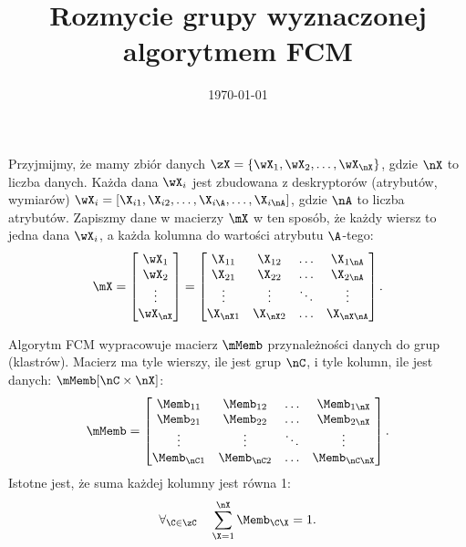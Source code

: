 \documentclass[a4paper,12pt]{article}
\title{\sffamily\bfseries Rozmycie grupy wyznaczonej algorytmem FCM}
\author{}
\date{\today}
\begin{document}
\maketitle

Przyjmijmy, że mamy zbiór danych $\zX = \left\{\wX_1, \wX_2, \ldots, \wX_\nX\right\}$, gdzie $\nX$ to liczba danych.
Każda dana $\wX_i$ jest zbudowana z deskryptorów (atrybutów, wymiarów) $\wX_i = \left[ \X_{i1}, \X_{i2}, \ldots, \X_{i\A}, \ldots, \X_{i\nA} \right]$, gdzie $\nA$ to liczba atrybutów. Zapiszmy dane w macierzy $\mX$ w ten sposób, że każdy wiersz to jedna dana $\wX_i$, a każda kolumna do wartości atrybutu $\A$-tego:
\begin{align}
\mX = 
\left[
\begin{matrix}
\wX_1 \\
\wX_2 \\
\vdots \\
\wX_\nX
\end{matrix}
\right] 
=
\left[
\begin{matrix}
\X_{11} & \X_{12} & \ldots & \X_{1\nA} \\
\X_{21} & \X_{22} & \ldots & \X_{2\nA} \\
\vdots  & \vdots  & \ddots & \vdots\\
\X_{\nX 1} & \X_{\nX 2} & \ldots & \X_{\nX \nA} \\
\end{matrix}
\right]
.
\end{align}

Algorytm FCM wypracowuje macierz $\mMemb$ przynależności danych do grup (klastrów). Macierz ma tyle wierszy, ile jest grup $\nC$, i tyle kolumn, ile jest danych: $\mMemb[\nC \times \nX]$:
\begin{align}
\mMemb = 
\left[
\begin{matrix}
\Memb_{11} & \Memb_{12} & \ldots & \Memb_{1\nX} \\
\Memb_{21} & \Memb_{22} & \ldots & \Memb_{2\nX} \\
\vdots  & \vdots  & \ddots & \vdots\\
\Memb_{\nC 1} & \Memb_{\nC 2} & \ldots & \Memb_{\nC \nX} \\
\end{matrix}
\right]
.
\end{align}
Istotne jest, że suma każdej kolumny jest równa 1: 
\begin{align}
\forall_{\C \in \zC} \quad \sum_{\X=1}^{\nX} \Memb_{\C \X} = 1.
\end{align}
\end{document}
